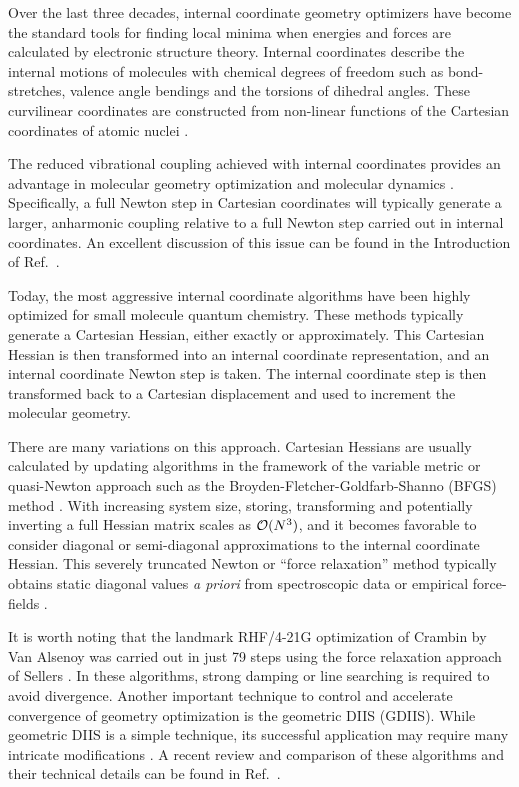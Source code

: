 \documentclass[prl,twocolumn,showpacs,twocolumngrid,superbib]{revtex4}
\begin{document}
Over the last three decades, internal coordinate geometry optimizers have become the standard 
tools for finding local minima when energies and forces are calculated by electronic structure 
theory. Internal coordinates describe the internal motions of molecules 
with chemical degrees of freedom such as bond-stretches, valence angle bendings and the torsions 
of dihedral angles. These curvilinear coordinates are constructed from non-linear functions of the 
Cartesian coordinates of atomic nuclei \cite{wilson}.

The reduced vibrational coupling achieved with internal coordinates provides an advantage 
in molecular geometry optimization \cite{pulay_review} and molecular dynamics \cite{pulay_dynamics}.
Specifically, a full Newton step in Cartesian coordinates will typically generate a larger, 
anharmonic coupling relative to a full Newton step carried out in internal coordinates.
An excellent discussion of this issue can be found in the Introduction of Ref.~.

Today, the most aggressive internal coordinate algorithms have been highly optimized for 
small molecule quantum chemistry.  These methods typically generate a Cartesian Hessian,
either exactly or approximately. This Cartesian Hessian is then transformed into an internal 
coordinate representation, and an internal coordinate Newton step is taken. The internal 
coordinate step is then transformed back to a Cartesian displacement and used to increment the 
molecular geometry.

There are many variations on this approach.  Cartesian Hessians are usually calculated by updating 
algorithms in the framework of the variable metric or quasi-Newton approach such as the  
Broyden-Fletcher-Goldfarb-Shanno (BFGS) method \cite{RFletcher}.  With increasing system size, storing,
transforming and potentially inverting a full Hessian matrix scales as ${\cal O}(N^3)$, and it becomes
favorable to consider diagonal or semi-diagonal approximations to the internal coordinate Hessian. 
This severely truncated Newton or  ``force relaxation'' method typically obtains static diagonal values 
{\em a priori} from spectroscopic data or empirical force-fields 
\cite{pulay_69,fogarasi_diaghess,Pulay_natural_internals,pulay_review,sellers,van_alsenoy_98,lindh}.

It is worth noting that the landmark RHF/4-21G optimization of Crambin by Van Alsenoy \cite{van_alsenoy_98}
was carried out in just 79 steps using the force relaxation approach of Sellers \cite{sellers}.
In these algorithms, strong damping \cite{sellers} or line searching \cite{sclegel_linesearch}
is required to avoid divergence. Another important technique to control and accelerate convergence of 
geometry optimization is the geometric DIIS \cite{Pulay_GDIIS} (GDIIS). While geometric DIIS is a simple 
technique, its successful application may require many intricate modifications \cite{Farkas_GDIIS}.  A 
recent review and comparison of these algorithms and their technical details can be found in 
Ref.~.  
\end{document}
